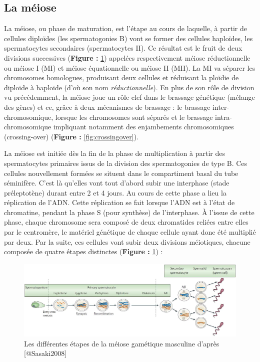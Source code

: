 \documentclass[12pt,twoside]{ugathesis}
\theoremstyle{definition}
\theoremstyle{definition}
\theoremstyle{remark}
\begin{document}
\newpage 

\hypertarget{meiose}{\subsection{La méiose}\label{meiose}}

La méiose, ou phase de maturation, est l'étape au cours de laquelle, à
partir de cellules diploïdes (les spermatogonies B) vont se former des
cellules haploïdes, les spermatocytes secondaires (spermatocytes II). Ce
résultat est le fruit de deux divisions successives (\textbf{Figure :
}\ref{fig:meiose}) appelées respectivement méiose réductionnelle ou
méiose I (MI) et méiose équationnelle ou méiose II (MII). La MI va
séparer les chromosomes homologues, produisant deux cellules et
réduisant la ploïdie de diploïde à haploïde (d'où son nom
\emph{réductionnelle}). En plus de son rôle de division vu précédemment,
la méiose joue un rôle clef dans le brassage génétique (mélange des
gènes) et ce, grâce à deux mécanismes de brassage : le brassage
inter-chromosomique, lorsque les chromosomes sont séparés et le brassage
intra-chromosomique impliquant notamment des enjambements chromosomiques
(crossing-over) (\textbf{Figure : }\ref{fig:crossingover}).

La méiose est initiée dès la fin de la phase de multiplication à partir
des spermatocytes primaires issus de la division des spermatogonies de
type B. Ces cellules nouvellement formées se situent dans le
compartiment basal du tube séminifère. C'est là qu'elles vont tout
d'abord subir une interphase (stade préleptotène) durant entre 2 et 4
jours. Au cours de cette phase a lieu la réplication de l'ADN. Cette
réplication se fait lorsque l'ADN est à l'état de chromatine, pendant la
phase S (pour synthèse) de l'interphase. À l'issue de cette phase,
chaque chromosome sera composé de deux chromatides reliées entre elles
par le centromère, le matériel génétique de chaque cellule ayant donc
été multiplié par deux. Par la suite, ces cellules vont subir deux
divisions méiotiques, chacune composée de quatre étapes distinctes
(\textbf{Figure : }\ref{fig:meiose}) :

\begin{figure}

{\centering \includegraphics[scale=0.33]{figure/Meiosis_Stages} 

}

\caption[Les différentes étapes de la méiose gamétique masculine]{Les différentes étapes de la méiose gamétique masculine d'après [@Sasaki2008]}\label{fig:meiose}
\end{figure}
\end{document}
